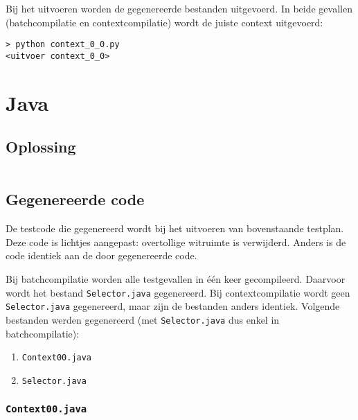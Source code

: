 Bij het uitvoeren worden de gegenereerde bestanden uitgevoerd.
In beide gevallen (batchcompilatie en contextcompilatie) wordt de juiste context uitgevoerd:

\begin{verbatim}
> python context_0_0.py
<uitvoer context_0_0>
\end{verbatim}

\section{Java}\label{sec:echo-function-java}

\subsection{Oplossing}\label{subsec:echo-function-java-oplossing}

\inputminted{java}{sources/echo-function/correct.java}

\subsection{Gegenereerde code}\label{subsec:echo-function-java-gegenereerde-code}

De testcode die gegenereerd wordt bij het uitvoeren van bovenstaande testplan.
Deze code is lichtjes aangepast: overtollige witruimte is verwijderd.
Anders is de code identiek aan de door \tested{} gegenereerde code.

Bij batchcompilatie worden alle testgevallen in één keer gecompileerd.
Daarvoor wordt het bestand \texttt{Selector.java} gegenereerd.
Bij contextcompilatie wordt geen \texttt{Selector.java} gegenereerd, maar zijn de bestanden anders identiek.
Volgende bestanden werden gegenereerd (met \texttt{Selector.java} dus enkel in batchcompilatie):

\begin{enumerate}
    \item \texttt{Context00.java}
    \item \texttt{Selector.java}
\end{enumerate}

\subsubsection{\texttt{Context00.java}}

\inputminted{java}{sources/echo-function/Context00.java}

